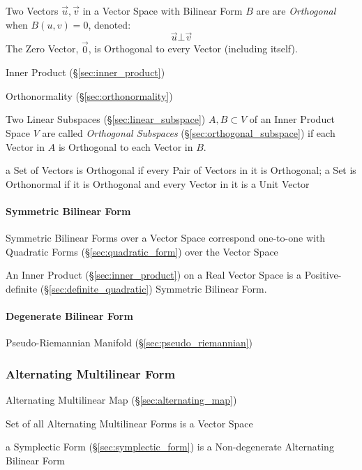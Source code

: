 Two Vectors $\vec{u}, \vec{v}$ in a Vector Space with Bilinear Form $B$
are are \emph{Orthogonal} when $B(u,v) = 0$, denoted:
\[
  \vec{u} \bot \vec{v}
\]
The Zero Vector, $\vec{0}$, is Orthogonal to every Vector (including itself).

\fist Inner Product (\S\ref{sec:inner_product})

\fist Orthonormality (\S\ref{sec:orthonormality})

Two Linear Subspaces (\S\ref{sec:linear_subspace}) $A, B \subset V$ of an Inner
Product Space $V$ are called \emph{Orthogonal Subspaces}
(\S\ref{sec:orthogonal_subspace}) if each Vector in $A$ is Orthogonal to each
Vector in $B$.

a Set of Vectors is Orthogonal if every Pair of Vectors in it is Orthogonal; a
Set is Orthonormal if it is Orthogonal and every Vector in it is a Unit Vector



\paragraph{Symmetric Bilinear Form}\label{sec:symmetric_bilinear}\hfill

Symmetric Bilinear Forms over a Vector Space correspond one-to-one
with Quadratic Forms (\S\ref{sec:quadratic_form}) over the Vector
Space

An Inner Product (\S\ref{sec:inner_product}) on a Real Vector Space is
a Positive-definite (\S\ref{sec:definite_quadratic}) Symmetric
Bilinear Form.



\paragraph{Degenerate Bilinear Form}
\label{sec:degenerate_bilinear_form}\hfill

Pseudo-Riemannian Manifold (\S\ref{sec:pseudo_riemannian})



\subsubsection{Alternating Multilinear Form}\label{sec:alternating_form}

Alternating Multilinear Map (\S\ref{sec:alternating_map})

Set of all Alternating Multilinear Forms is a Vector Space

a Symplectic Form (\S\ref{sec:symplectic_form}) is a Non-degenerate Alternating
Bilinear Form



